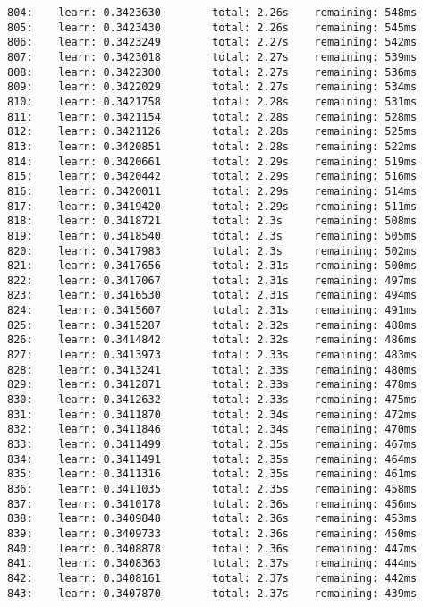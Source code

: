 \documentclass[11pt]{article}
\begin{document}
\begin{Verbatim}[commandchars=\\\{\}]
804:    learn: 0.3423630        total: 2.26s    remaining: 548ms
805:    learn: 0.3423430        total: 2.26s    remaining: 545ms
806:    learn: 0.3423249        total: 2.27s    remaining: 542ms
807:    learn: 0.3423018        total: 2.27s    remaining: 539ms
808:    learn: 0.3422300        total: 2.27s    remaining: 536ms
809:    learn: 0.3422029        total: 2.27s    remaining: 534ms
810:    learn: 0.3421758        total: 2.28s    remaining: 531ms
811:    learn: 0.3421154        total: 2.28s    remaining: 528ms
812:    learn: 0.3421126        total: 2.28s    remaining: 525ms
813:    learn: 0.3420851        total: 2.28s    remaining: 522ms
814:    learn: 0.3420661        total: 2.29s    remaining: 519ms
815:    learn: 0.3420442        total: 2.29s    remaining: 516ms
816:    learn: 0.3420011        total: 2.29s    remaining: 514ms
817:    learn: 0.3419420        total: 2.29s    remaining: 511ms
818:    learn: 0.3418721        total: 2.3s     remaining: 508ms
819:    learn: 0.3418540        total: 2.3s     remaining: 505ms
820:    learn: 0.3417983        total: 2.3s     remaining: 502ms
821:    learn: 0.3417656        total: 2.31s    remaining: 500ms
822:    learn: 0.3417067        total: 2.31s    remaining: 497ms
823:    learn: 0.3416530        total: 2.31s    remaining: 494ms
824:    learn: 0.3415607        total: 2.31s    remaining: 491ms
825:    learn: 0.3415287        total: 2.32s    remaining: 488ms
826:    learn: 0.3414842        total: 2.32s    remaining: 486ms
827:    learn: 0.3413973        total: 2.33s    remaining: 483ms
828:    learn: 0.3413241        total: 2.33s    remaining: 480ms
829:    learn: 0.3412871        total: 2.33s    remaining: 478ms
830:    learn: 0.3412632        total: 2.33s    remaining: 475ms
831:    learn: 0.3411870        total: 2.34s    remaining: 472ms
832:    learn: 0.3411846        total: 2.34s    remaining: 470ms
833:    learn: 0.3411499        total: 2.35s    remaining: 467ms
834:    learn: 0.3411491        total: 2.35s    remaining: 464ms
835:    learn: 0.3411316        total: 2.35s    remaining: 461ms
836:    learn: 0.3411035        total: 2.35s    remaining: 458ms
837:    learn: 0.3410178        total: 2.36s    remaining: 456ms
838:    learn: 0.3409848        total: 2.36s    remaining: 453ms
839:    learn: 0.3409733        total: 2.36s    remaining: 450ms
840:    learn: 0.3408878        total: 2.36s    remaining: 447ms
841:    learn: 0.3408363        total: 2.37s    remaining: 444ms
842:    learn: 0.3408161        total: 2.37s    remaining: 442ms
843:    learn: 0.3407870        total: 2.37s    remaining: 439ms

\end{Verbatim}
\end{document}
